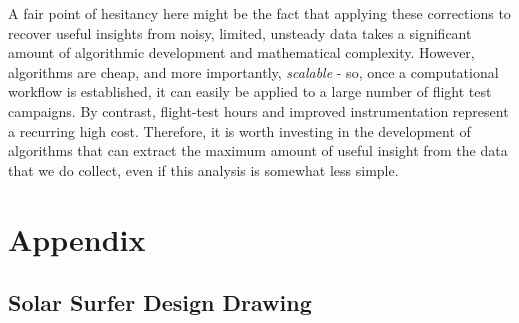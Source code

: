 \documentclass[conf]{new-aiaa}
\begin{document}
    A fair point of hesitancy here might be the fact that applying these corrections to recover useful insights from noisy, limited, unsteady data takes a significant amount of algorithmic development and mathematical complexity. However, algorithms are cheap, and more importantly, \emph{scalable} - so, once a computational workflow is established, it can easily be applied to a large number of flight test campaigns. By contrast, flight-test hours and improved instrumentation represent a recurring high cost. Therefore, it is worth investing in the development of algorithms that can extract the maximum amount of useful insight from the data that we do collect, even if this analysis is somewhat less simple.



    \newpage

    \section*{Appendix}

    \subsection{Solar Surfer Design Drawing}
    \label{subsec:solar_surfer_drawing}

    \begin{figure}[H]
        \centering
        \label{fig:solar_surfer_design}
    \end{figure}
\end{document}
